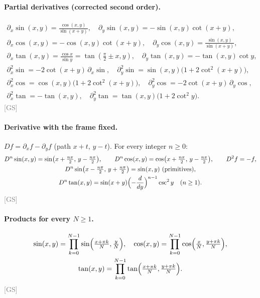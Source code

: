 \documentclass[11pt]{article}
\newcommand{\src}[1]{\hfill{\small\textcolor{gray}{[#1]}}}
\begin{document}
\paragraph{Partial derivatives (corrected second order).}
\begin{gather*}
\partial_x\sin(x,y) = \frac{\cos(x,y)}{\sin(x+y)},\quad \partial_y\sin(x,y) = -\sin(x,y)\cot(x+y),\\
\partial_x\cos(x,y) = -\cos(x,y)\cot(x+y),\quad
\partial_y\cos(x,y) = \frac{\sin(x,y)}{\sin(x+y)},\\
\partial_x\tan(x,y) = \frac{\cos x}{\sin y} = \tan(\tfrac\pi2\pm x,y),\quad \partial_y\tan(x,y) = -\tan(x,y)\cot y,\\
\partial_x^2\sin = -2\cot(x+y)\,\partial_x\sin,\quad \partial_y^2\sin = \sin(x,y)\bigl(1+2\cot^2(x+y)\bigr),\\
\partial_x^2\cos = \cos(x,y)\bigl(1+2\cot^2(x+y)\bigr),\quad
\partial_y^2\cos = -2\cot(x+y)\,\partial_y\cos,\\ \partial_x^2\tan = -\tan(x,y),\quad
\partial_y^2\tan = \tan(x,y)\bigl(1+2\cot^2 y\bigr).
\end{gather*}
\src{GS}

\paragraph{Derivative with the frame fixed.} $Df = \partial_x f - \partial_y f$ (path $x+t$, $y-t$). For every integer $n\ge0$:
\begin{gather*}
D^n\sin(x,y) = \sin\bigl(x+\tfrac{n\pi}{2},\,y-\tfrac{n\pi}{2}\bigr),\qquad
D^n\cos(x,y) = \cos\bigl(x+\tfrac{n\pi}{2},\,y-\tfrac{n\pi}{2}\bigr),\qquad D^2 f = -f,\\
D^n\sin\bigl(x-\tfrac{n\pi}{2},\,y+\tfrac{n\pi}{2}\bigr) = \sin(x,y)\ \text{(primitives)},\\
D^n\tan(x,y) = \sin(x+y)\Bigl(-\frac{d}{dy}\Bigr)^{n-1}\csc^2 y\quad(n\ge1).
\end{gather*}
\src{GS}

\paragraph{Products for every $N\ge1$.}
\begin{gather*}
\sin(x,y) = \prod_{k=0}^{N-1}\sin\Bigl(\tfrac{x+\pi k}{N},\tfrac{y}{N}\Bigr),\quad
\cos(x,y) = \prod_{k=0}^{N-1}\cos\Bigl(\tfrac{x}{N},\tfrac{y+\pi k}{N}\Bigr),\\
\tan(x,y) = \prod_{k=0}^{N-1}\tan\Bigl(\tfrac{x+\pi k}{N},\tfrac{y+\pi k}{N}\Bigr).
\end{gather*}\src{GS}
\end{document}
